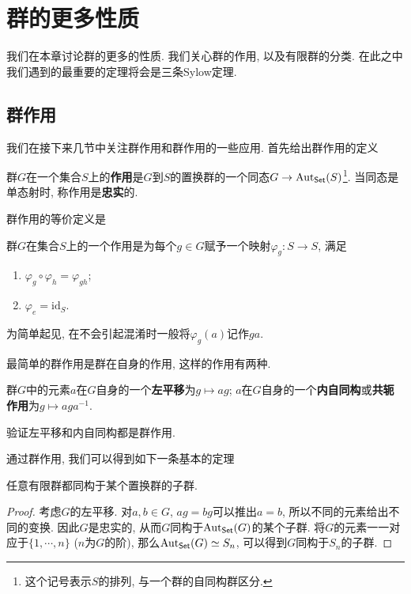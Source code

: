 \chapter{群的更多性质}
我们在本章讨论群的更多的性质.
我们关心群的作用, 以及有限群的分类.
在此之中我们遇到的最重要的定理将会是三条Sylow定理.

\section{群作用}

我们在接下来几节中关注群作用和群作用的一些应用.
首先给出群作用的定义
\begin{defn}
    群$G$在一个集合$S$上的\textbf{作用}是$G$到$S$的置换群的一个同态$G\to\operatorname{Aut}_{\mathsf{Set}}(S)$\footnote{这个记号表示$S$的排列, 与一个群的自同构群区分.}.
    当同态是单态射时, 称作用是\textbf{忠实}的.
\end{defn}

群作用的等价定义是
\begin{defn}
    群$G$在集合$S$上的一个作用是为每个$g\in G$赋予一个映射$\varphi_g:S\to S$, 满足
    \begin{enumerate}[(1)]
        \item $\varphi_g\circ\varphi_h=\varphi_{gh}$;
        \item $\varphi_e=\mathrm{id}_S$.
    \end{enumerate}
\end{defn}

\begin{sym}
    为简单起见, 在不会引起混淆时一般将$\varphi_g(a)$记作$ga$.
\end{sym}

最简单的群作用是群在自身的作用, 这样的作用有两种.
\begin{defn}
    群$G$中的元素$a$在$G$自身的一个\textbf{左平移}为$g\mapsto ag$;
    $a$在$G$自身的一个\textbf{内自同构}或\textbf{共轭作用}为$g\mapsto aga^{-1}$.
\end{defn}

\begin{ex}
    验证左平移和内自同构都是群作用.
\end{ex}

通过群作用, 我们可以得到如下一条基本的定理
\begin{thm}[Cayley]
    任意有限群都同构于某个置换群的子群.
\end{thm}
\begin{proof}
    考虑$G$的左平移.
    对$a,b\in G$, $ag=bg$可以推出$a=b$, 所以不同的元素给出不同的变换.
    因此$G$是忠实的, 从而$G$同构于$\operatorname{Aut}_{\mathsf{Set}}(G)$的某个子群.
    将$G$的元素一一对应于$\{1,\cdots,n\}$ ($n$为$G$的阶), 那么$\operatorname{Aut}_{\mathsf{Set}}(G)\simeq S_n$, 可以得到$G$同构于$S_n$的子群.
\end{proof}

